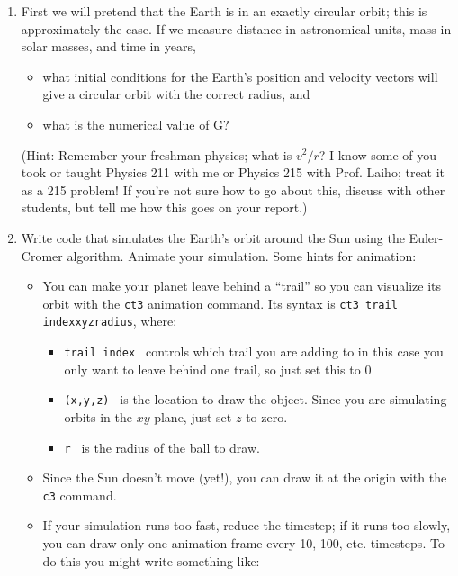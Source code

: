 \documentclass[12pt]{article}
\def\LT{\textlangle{}}
\def\RT{\textrangle{}}
\begin{document}
\begin{enumerate}
\item First we will pretend that the Earth is in an exactly circular orbit;
  this is approximately the case. If we measure distance in astronomical units, mass in solar masses,
    and time in years,
	\begin{itemize}
  \item{what initial conditions for the Earth's position and velocity 
    vectors will give a circular orbit with the correct radius, and}
  \item{what is the numerical value of G?}
  \end{itemize}

  (Hint: Remember your freshman physics; what is $v^2/r$? I know some of you 
   took or taught Physics 211 with me or Physics 215 with Prof. Laiho; treat it as a 215 problem! If you're not 
   sure how to go about this, discuss with other students, but tell me how this goes on your report.)
 

\item Write code that simulates the Earth's orbit around the Sun using the Euler-Cromer algorithm. Animate your simulation. Some hints for animation:

\begin{itemize}
\item { You can make your planet leave behind a ``trail'' so you can visualize its orbit with the {\tt ct3} animation command. Its syntax is 
{\tt ct3 \LT trail index\RT  \LT x\RT  \LT y\RT  \LT z\RT  \LT radius\RT }, where:

\begin{itemize}
\item {\tt \LT trail index \RT} controls which trail you are adding to in this case you only want to leave behind one trail, so just set this to 0
\item {\tt \LT (x,y,z) \RT} is the location to draw the object. Since you are simulating orbits in the $xy$-plane, just set $z$ to zero.
\item {\tt \LT r \RT} is the radius of the ball to draw.
\end{itemize}
}

\item Since the Sun doesn't move (yet!), you can draw it at the origin with the {\tt c3} command.
\item If your simulation runs too fast, reduce the timestep; if it runs too slowly, you can draw only one animation frame every 10, 100, etc. timesteps.
To do this you might write something like:


\end{itemize}
\end{enumerate}
\end{document}
